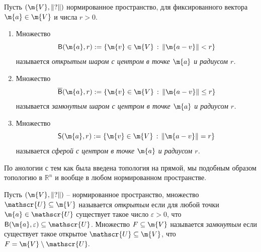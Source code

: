 

\begin{definition}
    Пусть $(\m{V}, \|?\|)$ нормированное пространство, для фиксированного вектора $\m{a} \in \m{V}$ и числа $r >0$.
    \begin{enumerate}
    \item Множество
    \[
     \mathsf{B}(\m{a}, r): = \{ \m{v}\in \m{V}\, :\, \| \m{a -v} \| < r \}
    \]
    называется \textit{открытым шаром с центром в точке $\m{a}$ и радиусом $r$.} 
    \item Множество
    \[
     \overline{\mathsf{B}}(\m{a}, r): = \{ \m{v}\in \m{V}\, :\, \| \m{a -v} \| \le r \}
    \]
    называется \textit{замкнутым шаром с центром в точке $\m{a}$ и радиусом $r$.}
    \item Множество
    \[
     \mathsf{S}(\m{a}, r): = \{ \m{v}\in \m{V}\, :\, \| \m{a -v} \| = r \}
    \]
    называется \textit{сферой с центром в точке $\m{a}$ и радиусом $r$.} 
    \end{enumerate}
        
\end{definition}


По анологии с тем как была введена топология на прямой, мы подобным образом топологию в $\mathbb{R}^n$ и вообще в любом нормированном пространстве.

\begin{definition}
    Пусть $(\m{V}, \|?\|)$ -- нормированное пространство, множество $\mathscr{U} \subseteq \m{V}$ называется \textit{открытым} если для любой точки $\m{a} \in \mathscr{U}$ существует такое число $\varepsilon>0$, что $\mathsf{B}(\m{a}, \varepsilon) \subseteq \mathscr{U}$.  Множество $F \subseteq \m{V}$ называется \textit{замкнутым} если существует такое открытое $\mathscr{U} \subseteq \m{V}$, что $F = \m{V}\setminus \mathscr{U}.$
\end{definition}

